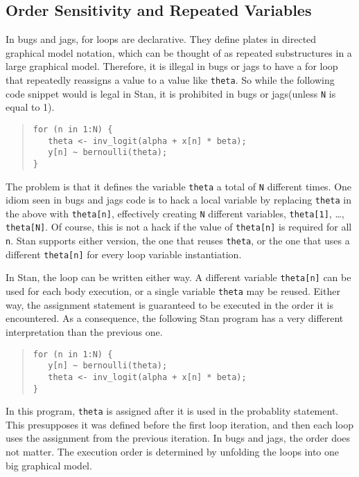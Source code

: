 \documentclass[10pt]{report}
\newcommand{\Stan}{Stan\xspace}
\newcommand{\acronym}[1]{{\sc #1}\xspace}
\newcommand{\BUGS}{\acronym{bugs}}
\newcommand{\JAGS}{\acronym{jags}}
\newcommand{\code}[1]{{\tt #1}}
\begin{document}
\subsection{Order Sensitivity and Repeated Variables}

In \BUGS and \JAGS, for loops are declarative.  They define plates in
directed graphical model notation, which can be thought of as repeated
substructures in a large graphical model.  Therefore, it is illegal in
\BUGS or \JAGS to have a for loop that repeatedly reassigns a value to
a value like \code{theta}.  So while the following code snippet would
is legal in \Stan, it is prohibited in \BUGS or \JAGS (unless \code{N}
is equal to 1).
%
\begin{quote}
\begin{Verbatim} 
for (n in 1:N) {
   theta <- inv_logit(alpha + x[n] * beta);
   y[n] ~ bernoulli(theta);
}
\end{Verbatim}
\end{quote}
% 
The problem is that it defines the variable \code{theta} a total of
\code{N} different times.  One idiom seen in \BUGS and \JAGS code is
to hack a local variable by replacing \code{theta} in the above with
\code{theta[n]}, effectively creating \code{N} different variables,
\code{theta[1]}, \ldots, \code{theta[N]}.  Of course, this is not a
hack if the value of \code{theta[n]} is required for all \code{n}.
\Stan supports either version, the one that reuses \code{theta}, or
the one that uses a different \code{theta[n]} for every loop variable
instantiation.  

In \Stan, the loop can be written either way.  A different variable
\code{theta[n]} can be used for each body execution, or a single
variable \code{theta} may be reused. Either way, the assignment
statement is guaranteed to be executed in the order it is encountered.
As a consequence, the following \Stan program has a very different
interpretation than the previous one.
%
\begin{quote}
\begin{Verbatim}
for (n in 1:N) {
   y[n] ~ bernoulli(theta);
   theta <- inv_logit(alpha + x[n] * beta);
}
\end{Verbatim}
\end{quote}
%
In this program, \code{theta} is assigned after it is used in the
probablity statement.  This presupposes it was defined before the
first loop iteration, and then each loop uses the assignment from the
previous iteration.  In \BUGS and \JAGS, the order does not matter.
The execution order is determined by unfolding the loops into one big
graphical model.
\end{document}
